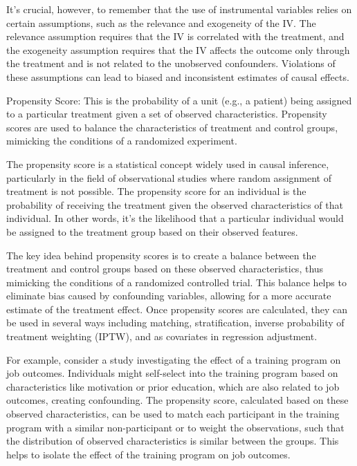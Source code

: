 It's crucial, however, to remember that the use of instrumental variables relies on certain assumptions, such as the relevance and exogeneity of the IV. The relevance assumption requires that the IV is correlated with the treatment, and the exogeneity assumption requires that the IV affects the outcome only through the treatment and is not related to the unobserved confounders. Violations of these assumptions can lead to biased and inconsistent estimates of causal effects.



Propensity Score: This is the probability of a unit (e.g., a patient) being assigned to a particular treatment given a set of observed characteristics. Propensity scores are used to balance the characteristics of treatment and control groups, mimicking the conditions of a randomized experiment.

The propensity score is a statistical concept widely used in causal inference, particularly in the field of observational studies where random assignment of treatment is not possible. The propensity score for an individual is the probability of receiving the treatment given the observed characteristics of that individual. In other words, it's the likelihood that a particular individual would be assigned to the treatment group based on their observed features.

The key idea behind propensity scores is to create a balance between the treatment and control groups based on these observed characteristics, thus mimicking the conditions of a randomized controlled trial. This balance helps to eliminate bias caused by confounding variables, allowing for a more accurate estimate of the treatment effect. Once propensity scores are calculated, they can be used in several ways including matching, stratification, inverse probability of treatment weighting (IPTW), and as covariates in regression adjustment.

For example, consider a study investigating the effect of a training program on job outcomes. Individuals might self-select into the training program based on characteristics like motivation or prior education, which are also related to job outcomes, creating confounding. The propensity score, calculated based on these observed characteristics, can be used to match each participant in the training program with a similar non-participant or to weight the observations, such that the distribution of observed characteristics is similar between the groups. This helps to isolate the effect of the training program on job outcomes.

